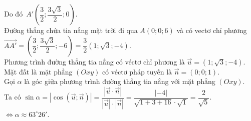 \begin{bt}
{		Do đó $A'\left(\dfrac{3}{2};\dfrac{3\sqrt{3}}{2};0\right)$.\\
		Đường thẳng chứa tia nắng mặt trời đi qua $A(0;0;6)$ và có vectơ chỉ phương \\ $\overrightarrow{AA'}=\left(\dfrac{3}{2};\dfrac{3\sqrt{3}}{2};-6\right)=\dfrac{3}{2}\left(1;\sqrt{3};-4\right)$.\\
		Phương trình đường thẳng tia nắng có véctơ chỉ phương là $\overrightarrow{u}=\left(1;\sqrt{3};-4\right)$.\\
		Mặt đất là mặt phẳng $\left(Oxy\right)$ có véctơ pháp tuyến là $\overrightarrow{n}=\left(0;0;1\right)$.\\
		Gọi $\alpha $ là góc giữa phương trình đường thẳng tia nắng với mặt phẳng $\left(Oxy\right)$.\\
		Ta có $\sin \alpha 
		=\left| \cos \left(\overrightarrow{u};\overrightarrow{n}\right)\right|
		=\dfrac{\left| \overrightarrow{u} \cdot \overrightarrow{n}\right|}
		{\left| \overrightarrow{u}\right| \cdot \left| \overrightarrow{n}\right|}
		=\dfrac{\left| -4\right|}{\sqrt{1+3+16} \cdot \sqrt{1}}=\dfrac{2}{\sqrt{5}}$.\\
		$\Leftrightarrow \alpha \approx{63^\circ}26'$.}
\end{bt}

